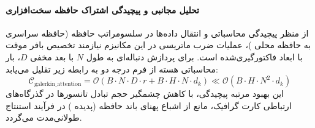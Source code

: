 \paragraph{تحلیل مجانبی و پیچیدگی اشتراک حافظه سخت‌افزاری}
از منظر پیچیدگی محاسباتی و انتقال داده‌ها در سلسومراتب حافظه (حافظه سراسری  به حافظه محلی )، عملیات ضرب ماتریسی در این مکانیزم نیازمند تخصیص بافر موقت با ابعاد فاکتورگیری‌شده است. برای پردازش دنباله‌ای به طول $N$ با بعد مخفی $D$، بار محاسباتی هسته از فرم درجه دو به رابطه زیر تقلیل می‌یابد:
\begin{equation}
\label{eq:complexity_galerkin_attention}
\mathcal{C}_{\text{galerkin\_attention}} = \mathcal{O}\left( B \cdot N \cdot D \cdot r + B \cdot H \cdot N \cdot d_k \right) \ll \mathcal{O}\left( B \cdot H \cdot N^2 \cdot d_k \right)
\end{equation}
این بهبود مرتبه پیچیدگی، با کاهش چشمگیر حجم تبادل تانسورها در گذرگاه‌های ارتباطی کارت گرافیک، مانع از اشباع پهنای باند حافظه (پدیده ) در فرآیند استنتاج طولانی‌مدت می‌گردد.